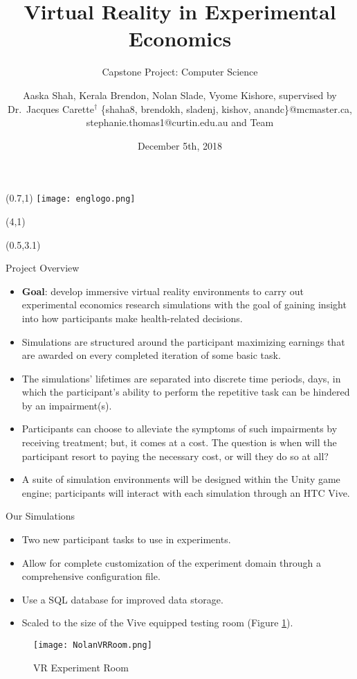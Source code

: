 \documentclass[22pt]{beamer}
\title{Virtual Reality in Experimental Economics}
\subtitle{Capstone Project: Computer Science}
\author[Shah, Brendon, Slade, Kishore \& Carette]{Aaska Shah, Kerala Brendon, Nolan Slade, Vyome Kishore, supervised by Dr.~Jacques Carette$^\dagger$ \vspace{0.3cm} \newline \small \{shaha8, brendokh, sladenj, kishov, anandc\}@mcmaster.ca, stephanie.thomas1@curtin.edu.au and Team}
\institute[McMaster University]{$^\dagger$Department of Computing and Software, McMaster University

1280 Main St. W, Hamilton, Ontario, Canada L8S 4L8}
\date{December 5th, 2018}
\begin{document}

\begin{frame}[fragile]

\begin{textblock}{2}(0.7,1)
\texttt{[image: englogo.png]} %
\end{textblock}

\begin{textblock}{8}(4,1)
\titlepage
\end{textblock}

\begin{textblock}{7.25}(0.5,3.1)

\begin{block}{Project Overview}
\begin{itemize}
\item \textbf{Goal}: develop immersive virtual reality environments to carry out experimental economics research simulations with the goal of gaining insight into how participants make health-related decisions.
\item Simulations are structured around the participant maximizing earnings that are awarded on every completed iteration of some basic task.
\item The simulations’ lifetimes are separated into discrete time periods, days, in which the participant’s
ability to perform the repetitive task can be hindered by an impairment(s).
\item Participants can choose to alleviate the symptoms of such impairments by receiving treatment; but, it comes at a cost. The question is when will the participant resort to paying the necessary cost, or will they do so at all? 
\item A suite of simulation environments will be designed within the Unity game engine; participants will interact with each simulation through an HTC Vive. 
\end{itemize}
\end{block}


\begin{block}{Our Simulations}
\begin{itemize}
\item Two new participant tasks to use in experiments.
\item Allow for complete customization of the experiment domain through a  comprehensive configuration file.
\item Use a SQL database for improved data storage.
\item Scaled to the size of the Vive equipped testing room (Figure \ref{fig:room}).
\end{itemize}
\begin{figure}
    \texttt{[image: NolanVRRoom.png]}
  \caption{VR Experiment Room}
\label{fig:room}
\end{figure}
\end{block}


\end{textblock}
\end{frame}
\end{document}
